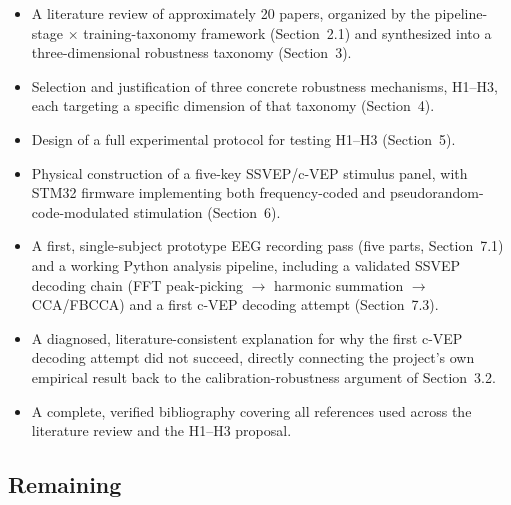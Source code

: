\documentclass[11pt]{article}
\begin{document}
\begin{itemize}
  \item A literature review of approximately 20 papers, organized by the pipeline-stage $\times$ training-taxonomy framework (Section~2.1) and synthesized into a three-dimensional robustness taxonomy (Section~3).
  \item Selection and justification of three concrete robustness mechanisms, H1--H3, each targeting a specific dimension of that taxonomy (Section~4).
  \item Design of a full experimental protocol for testing H1--H3 (Section~5).
  \item Physical construction of a five-key SSVEP/c-VEP stimulus panel, with STM32 firmware implementing both frequency-coded and pseudorandom-code-modulated stimulation (Section~6).
  \item A first, single-subject prototype EEG recording pass (five parts, Section~7.1) and a working Python analysis pipeline, including a validated SSVEP decoding chain (FFT peak-picking $\rightarrow$ harmonic summation $\rightarrow$ CCA/FBCCA) and a first c-VEP decoding attempt (Section~7.3).
  \item A diagnosed, literature-consistent explanation for why the first c-VEP decoding attempt did not succeed, directly connecting the project's own empirical result back to the calibration-robustness argument of Section~3.2.
  \item A complete, verified bibliography covering all references used across the literature review and the H1--H3 proposal.
\end{itemize}

\subsection{Remaining}
\end{document}
